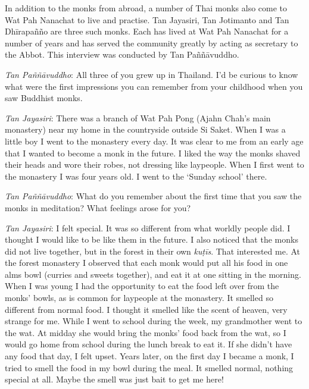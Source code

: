 
\label{no-thai-no-farang}

In addition to the monks from abroad, a number of Thai monks also
come to Wat Pah Nanachat to live and practise. Tan Jayasiri, Tan
Jotimanto and Tan Dhīrapañño are three such monks. Each has lived at Wat
Pah Nanachat for a number of years and has served the community greatly
by acting as secretary to the Abbot. This interview was conducted by Tan
Paññāvuddho.

\emph{Tan Paññāvuddho}: All three of you grew up in Thailand. I'd be
curious to know what were the first impressions you can remember from
your childhood when you saw Buddhist monks. 

\emph{Tan Jayasiri}: There was a branch of Wat Pah Pong (Ajahn Chah's
main monastery) near my home in the countryside outside Si Saket. When I
was a little boy I went to the monastery every day. It was clear to me
from an early age that I wanted to become a monk in the future. I liked
the way the monks shaved their heads and wore their robes, not dressing
like laypeople. When I first went to the monastery I was four years old. 
I went to the `Sunday school' there. 

\emph{Tan Paññāvuddho}: What do you remember about the first time that
you saw the monks in meditation? What feelings arose for you? 

\emph{Tan Jayasiri}: I felt special. It was so different from what
worldly people did. I thought I would like to be like them in the
future. I also noticed that the monks did not live together, but in the
forest in their own \emph{kuṭīs}. That interested me. At the forest
monastery I observed that each monk would put all his food in one alms
bowl (curries and sweets together), and eat it at one sitting in the
morning. When I was young I had the opportunity to eat the food left
over from the monks' bowls, as is common for laypeople at the monastery. 
It smelled so different from normal food. I thought it smelled like the
scent of heaven, very strange for me. While I went to school during the
week, my grandmother went to the wat. At midday she would bring the
monks' food back from the wat, so I would go home from school during the
lunch break to eat it. If she didn't have any food that day, I felt
upset. Years later, on the first day I became a monk, I tried to smell
the food in my bowl during the meal. It smelled normal, nothing special
at all. Maybe the smell was just bait to get me here! 

